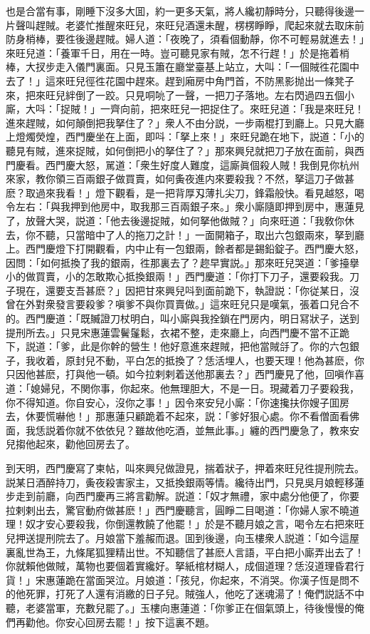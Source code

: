 也是合當有事，剛睡下沒多大囬，約一更多天氣，將人纔初靜時分，只聽得後邊一片聲叫趕賊。老婆忙推醒來旺兒，來旺兒酒還未醒，楞楞睜睜，爬起來就去取床前防身梢棒，要徃後邊趕賊。婦人道：「夜晚了，須看個動靜，你不可輕易就進去！」來旺兒道：「養軍千日，用在一時。豈可聽見家有賊，怎不行趕！」於是拖着梢棒，大扠步走入儀門裏面。只見玉簫在廳堂臺基上站立，大叫：「一個賊徃花園中去了！」這來旺兒徑徃花園中趕來。趕到廂房中角門首，不防黑影抛出一條凳子來，把來旺兒絆倒了一跤。只見哃喨了一聲，一把刀子落地。左右閃過四五個小廝，大呌：「捉賊！」一齊向前，把來旺兒一把捉住了。來旺兒道：「我是來旺兒！進來趕賊，如何顛倒把我拏住了？」衆人不由分説，一步兩棍打到廳上。只見大廳上燈燭熒煌，西門慶坐在上面，即呌：「拏上來！」來旺兒跪在地下，説道：「小的聽見有賊，進來捉賊，如何倒把小的拏住了？」那來興兒就把刀子放在面前，與西門慶看。西門慶大怒，駡道：「衆生好度人難度，這廝眞個殺人賊！我倒見你杭州來家，教你領三百兩銀子做買賣，如何夤夜進内來要殺我？不然，拏這刀子做甚麽？取過來我看！」燈下觀看，是一把背厚刄薄扎尖刀，鋒霜般快。看見越怒，喝令左右：「與我押到他房中，取我那三百兩銀子來。」衆小廝隨即押到房中，惠蓮見了，放聲大哭，説道：「他去後邊捉賊，如何拏他做賊？」向來旺道：「我敎你休去，你不聽，只當暗中了人的拖刀之計！」一面開箱子，取出六包銀兩來，拏到廳上。西門慶燈下打開觀看，内中止有一包銀兩，餘者都是錫鉛錠子。西門慶大怒，因問：「如何抵換了我的銀兩，徃那裏去了？趂早實説。」那來旺兒哭道：「爹擡擧小的做買賣，小的怎敢欺心抵換銀兩！」西門慶道：「你打下刀子，還要殺我。刀子現在，還要支吾甚麽？」因把甘來興兒呌到面前跪下，執證説：「你従某日，沒曾在外對衆發言要殺爹？嗔爹不與你買賣做。」這來旺兒只是嘆氣，張着口兒合不的。西門慶道：「既贓證刀杖明白，叫小廝與我拴鎖在門房内，明日冩狀子，送到提刑所去。」只見宋惠蓮雲鬢鬔鬆，衣裙不整，走來廳上，向西門慶不當不正跪下，説道：「爹，此是你幹的營生！他好意進來趕賊，把他當賊㧱了。你的六包銀子，我收着，原封兒不動，平白怎的抵換了？恁活埋人，也要天理！他為甚麽，你只因他甚麽，打與他一頓。如今拉剌剌着送他那裏去？」西門慶見了他，回嗔作喜道：「媳婦兒，不関你事，你起來。他無理胆大，不是一日。現藏着刀子要殺我，你不得知道。你自安心，沒你之事！」因令來安兒小廝：「你速攙扶你嫂子囬房去，休要慌嚇他！」那惠蓮只顧跪着不起來，説：「爹好狠心處。你不看僧面看佛面，我恁説着你就不依依兒？雖故他吃酒，並無此事。」纏的西門慶急了，教來安兒搊他起來，勸他回房去了。

到天明，西門慶寫了柬帖，叫來興兒做證見，揣着狀子，押着來旺兒徃提刑院去。説某日酒醉持刀，夤夜殺害家主，又抵換銀兩等情。纔待出門，只見吳月娘輕移蓮步走到前廳，向西門慶再三將言勸解。説道：「奴才無禮，家中處分他便了，你要拉剌剌出去，驚官動府做甚麽！」西門慶聽言，圓睜二目喝道：「你婦人家不曉道理！奴才安心要殺我，你倒還教饒了他罷！」於是不聽月娘之言，喝令左右把來旺兒押送提刑院去了。月娘當下羞赧而退。囬到後邊，向玉樓衆人説道：「如今這屋裏亂世為王，九條尾狐狸精出世。不知聽信了甚麽人言語，平白把小廝弄出去了！你就賴他做賊，萬物也要個着實纔好。拏紙棺材糊人，成個道理？恁沒道理昏君行貨！」宋惠蓮跪在當面哭泣。月娘道：「孩兒，你起來，不消哭。你漢子恆是問不的他死罪，打死了人還有消繳的日子兒。賊強人，他吃了迷魂湯了！俺們説話不中聽，老婆當軍，充數兒罷了。」玉樓向惠蓮道：「你爹正在個氣頭上，待後慢慢的俺們再勸他。你安心回房去罷！」按下這裏不題。

